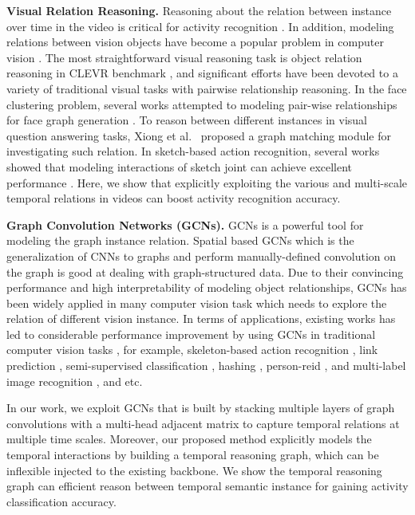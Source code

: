 \documentclass[conference,compsoc]{IEEEtran}
\begin{document}
    
    \textbf{Visual Relation Reasoning.} Reasoning about the relation between instance over time in the video is critical for activity recognition \cite{zhou2018temporal}. In addition, modeling relations between vision objects have become a popular problem in computer vision \cite{zhang2017visual, qi2018attentive, xiong2019visual, wang2019linkage}. 
    The most straightforward visual reasoning task is object relation reasoning in CLEVR benchmark \cite{johnson2017clevr}, and significant efforts have been devoted to a variety of traditional visual tasks with pairwise relationship reasoning. In the face clustering problem, several works attempted to modeling pair-wise relationships for face graph generation \cite{wang2019linkage, yang2019learning}. To reason between different instances in visual question answering tasks, Xiong et al.\ \cite{xiong2019visual} proposed a graph matching module for investigating such relation. In sketch-based action recognition, several works showed that modeling interactions of sketch joint can achieve excellent performance \cite{si2019an, shi2018non-local, stgcn2018aaai}. Here, we show that explicitly exploiting the various and multi-scale temporal relations in videos can boost activity recognition accuracy.
    
    
    \textbf{Graph Convolution Networks (GCNs).} GCNs is a powerful tool for modeling the graph instance relation. Spatial based GCNs \cite{zhou2018graph} which is the generalization of CNNs to graphs and perform manually-defined convolution on the graph is good at dealing with graph-structured data. Due to their convincing performance and high interpretability of modeling object relationships, GCNs has been widely applied in many computer vision task which needs to explore the relation of different vision instance. In terms of applications, existing works has led to considerable performance improvement by using GCNs in traditional computer vision tasks \cite{chen2018graph-based}, for example, skeleton-based action recognition \cite{stgcn2018aaai, shi2018non-local}, link prediction \cite{wang2019linkage, yang2019learning}, semi-supervised classification \cite{kipf2017semi-supervised}, hashing \cite{zhou2018hash, shen2017deep, shen2015supervised}, person-reid \cite{shen2018person}, and multi-label image recognition \cite{chen2019multi-label}, and etc.
    
    In our work, we exploit GCNs that is built by stacking multiple layers of graph convolutions with a multi-head adjacent matrix to capture temporal relations at multiple time scales. Moreover, our proposed method explicitly models the temporal interactions by building a temporal reasoning graph, which can be inflexible injected to the existing backbone. We show the temporal reasoning graph can efficient reason between temporal semantic instance for gaining activity classification accuracy.
    
\end{document}
